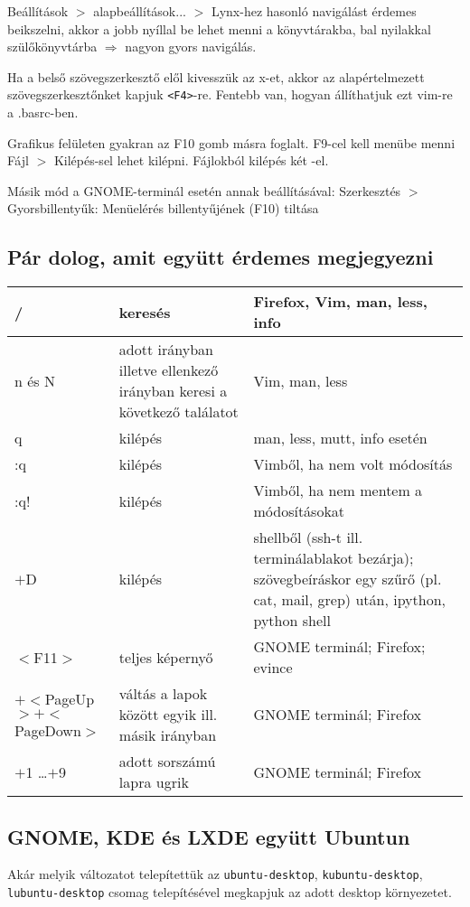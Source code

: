 \documentclass[a4paper]{article}
\newcommand{\code}{\texttt}
\newcommand{\Esc}{\framebox{\texttt{Esc}}}
\newcommand{\Ctrl}{\framebox{\texttt{Ctrl}}}
\newcommand{\Alt}{\framebox{\texttt{Alt}}}
\begin{document}
Beállítások $>$ alapbeállítások... $>$ Lynx-hez hasonló navigálást
érdemes beikszelni, akkor a jobb nyíllal be lehet menni a
könyvtárakba, bal nyilakkal szülőkönyvtárba $\Rightarrow$ nagyon gyors
navigálás.

Ha a belső szövegszerkesztő elől kivesszük az x-et, akkor az
alapértelmezett szövegszerkesztőnket kapjuk \verb+<F4>+-re. Fentebb van,
hogyan állíthatjuk ezt vim-re a .basrc-ben.

Grafikus felületen gyakran az F10 gomb másra foglalt. F9-cel kell
menübe menni Fájl $>$ Kilépés-sel lehet kilépni. Fájlokból kilépés két
\Esc-el.

Másik mód a GNOME-terminál esetén annak beállításával: Szerkesztés $>$
Gyorsbillentyűk: Menüelérés billentyűjének (F10) tiltása

\subsection{Pár dolog, amit együtt érdemes megjegyezni}

\noindent
\begin{tabularx}{\textwidth}{|l|X|X|}
\hline
/ & keresés &Firefox, Vim, man, less, info\\
\hline
n és N& adott irányban illetve ellenkező irányban keresi a következő
találatot&Vim, man, less\\
\hline
q& kilépés& man, less, mutt, info esetén\\
\hline
:q& kilépés& Vimből, ha nem volt módosítás\\
\hline
:q!& kilépés& Vimből, ha nem mentem a  módosításokat\\
\hline
\Ctrl$+$D& kilépés& shellből (ssh-t ill. terminálablakot bezárja); szövegbeíráskor  egy
szűrő (pl. cat, mail, grep) után, ipython, python shell\\
\hline
$<$F11$>$& teljes képernyő& GNOME terminál; Firefox; evince\\
\hline
\Ctrl$+<$PageUp$>$\quad \Ctrl$+<$PageDown$>$& váltás a lapok között
egyik ill. másik irányban&
GNOME terminál; Firefox\\
\hline
\Alt$+$1 \dots \Alt$+$9& adott sorszámú lapra ugrik& GNOME terminál; Firefox\\
\hline
\end{tabularx}

\subsection{GNOME, KDE és LXDE együtt Ubuntun}
Akár melyik változatot telepítettük az
\code{ubuntu-desktop},
\code{kubuntu-desktop},
\code{lubuntu-desktop} csomag telepítésével megkapjuk az adott
desktop környezetet.
\end{document}
